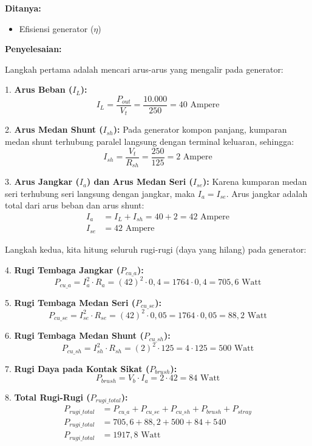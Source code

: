 \documentclass[12pt, a4paper]{article}
\begin{document}
\textbf{Ditanya:}
\begin{itemize}
    \item Efisiensi generator ($\eta$)
\end{itemize}

\textbf{Penyelesaian:}

Langkah pertama adalah mencari arus-arus yang mengalir pada generator:

1. \textbf{Arus Beban ($I_L$):}
\[
    I_L = \frac{P_{out}}{V_t} = \frac{10.000}{250} = 40 \text{ Ampere}
\]

2. \textbf{Arus Medan Shunt ($I_{sh}$):}
Pada generator kompon panjang, kumparan medan shunt terhubung paralel langsung dengan terminal keluaran, sehingga:
\[
    I_{sh} = \frac{V_t}{R_{sh}} = \frac{250}{125} = 2 \text{ Ampere}
\]

3. \textbf{Arus Jangkar ($I_a$) dan Arus Medan Seri ($I_{se}$):}
Karena kumparan medan seri terhubung seri langsung dengan jangkar, maka $I_a = I_{se}$. Arus jangkar adalah total dari arus beban dan arus shunt:
\begin{align*}
    I_a &= I_L + I_{sh} = 40 + 2 = 42 \text{ Ampere} \\
    I_{se} &= 42 \text{ Ampere}
\end{align*}

Langkah kedua, kita hitung seluruh rugi-rugi (daya yang hilang) pada generator:

4. \textbf{Rugi Tembaga Jangkar ($P_{cu\_a}$):}
\[
    P_{cu\_a} = I_a^2 \cdot R_a = (42)^2 \cdot 0,4 = 1764 \cdot 0,4 = 705,6 \text{ Watt}
\]

5. \textbf{Rugi Tembaga Medan Seri ($P_{cu\_se}$):}
\[
    P_{cu\_se} = I_{se}^2 \cdot R_{se} = (42)^2 \cdot 0,05 = 1764 \cdot 0,05 = 88,2 \text{ Watt}
\]

6. \textbf{Rugi Tembaga Medan Shunt ($P_{cu\_sh}$):}
\[
    P_{cu\_sh} = I_{sh}^2 \cdot R_{sh} = (2)^2 \cdot 125 = 4 \cdot 125 = 500 \text{ Watt}
\]

7. \textbf{Rugi Daya pada Kontak Sikat ($P_{brush}$):}
\[
    P_{brush} = V_b \cdot I_a = 2 \cdot 42 = 84 \text{ Watt}
\]

8. \textbf{Total Rugi-Rugi ($P_{rugi\_total}$):}
\begin{align*}
    P_{rugi\_total} &= P_{cu\_a} + P_{cu\_se} + P_{cu\_sh} + P_{brush} + P_{stray} \\
    P_{rugi\_total} &= 705,6 + 88,2 + 500 + 84 + 540 \\
    P_{rugi\_total} &= 1917,8 \text{ Watt}
\end{align*}
\end{document}
